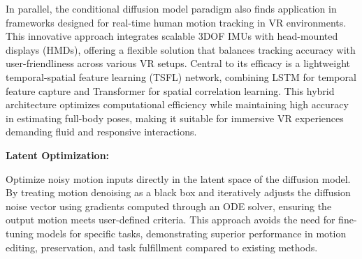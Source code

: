 In parallel, the conditional diffusion model paradigm also finds application in frameworks designed for real-time human motion tracking in VR environments. This innovative approach integrates scalable 3DOF IMUs with head-mounted displays (HMDs), offering a flexible solution that balances tracking accuracy with user-friendliness across various VR setups. Central to its efficacy is a lightweight temporal-spatial feature learning (TSFL) network, combining LSTM for temporal feature capture and Transformer for spatial correlation learning. This hybrid architecture optimizes computational efficiency while maintaining high accuracy in estimating full-body poses, making it suitable for immersive VR experiences demanding fluid and responsive interactions.

\textbf{Latent Optimization:}

Optimize noisy motion inputs directly in the latent space of the diffusion model. By treating motion denoising as a black box and iteratively adjusts the diffusion noise vector using gradients computed through an ODE solver, ensuring the output motion meets user-defined criteria. This approach avoids the need for fine-tuning models for specific tasks, demonstrating superior performance in motion editing, preservation, and task fulfillment compared to existing methods.